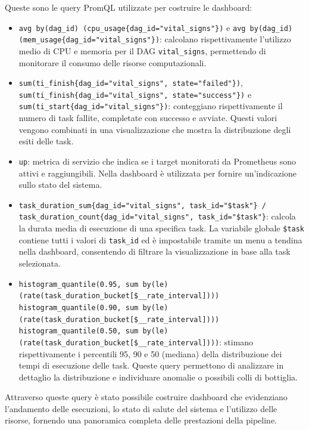 Queste sono le query PromQL utilizzate per costruire le dashboard:

\begin{itemize}
    \item \texttt{avg by(dag\_id) (cpu\_usage\{dag\_id="vital\_signs"\})} e \texttt{avg by(dag\_id) (mem\_usage\{dag\_id="vital\_signs"\})}: calcolano rispettivamente l’utilizzo medio di CPU e memoria per il DAG \texttt{vital\_signs}, permettendo di monitorare il consumo delle risorse computazionali.
    
    \item \texttt{sum(ti\_finish\{dag\_id="vital\_signs", state="failed"\})}, \texttt{sum(ti\_finish\{dag\_id="vital\_signs", state="success"\})} e \texttt{sum(ti\_start\{dag\_id="vital\_signs"\})}: conteggiano rispettivamente il numero di task fallite, completate con successo e avviate. Questi valori vengono combinati in una visualizzazione che mostra la distribuzione degli esiti delle task.
    
    \item \texttt{up}: metrica di servizio che indica se i target monitorati da Prometheus sono attivi e raggiungibili. Nella dashboard è utilizzata per fornire un’indicazione sullo stato del sistema.
    
    \item \texttt{task\_duration\_sum\{dag\_id="vital\_signs", task\_id="\$task"\} / task\_duration\_count\{dag\_id="vital\_signs", task\_id="\$task"\}}: calcola la durata media di esecuzione di una specifica task. La variabile globale \texttt{\$task} contiene tutti i valori di \texttt{task\_id} ed è impostabile tramite un menu a tendina nella dashboard, consentendo di filtrare la visualizzazione in base alla task selezionata.
    
    \item \texttt{histogram\_quantile(0.95, sum by(le)(rate(task\_duration\_bucket[\$\_\_rate\_interval])))}  
    \texttt{histogram\_quantile(0.90, sum by(le)(rate(task\_duration\_bucket[\$\_\_rate\_interval])))}  
    \texttt{histogram\_quantile(0.50, sum by(le)(rate(task\_duration\_bucket[\$\_\_rate\_interval])))}: stimano rispettivamente i percentili 95, 90 e 50 (mediana) della distribuzione dei tempi di esecuzione delle task. Queste query permettono di analizzare in dettaglio la distribuzione e individuare anomalie o possibili colli di bottiglia.
\end{itemize}

Attraverso queste query è stato possibile costruire dashboard che evidenziano l’andamento delle esecuzioni, lo stato di salute del sistema e l’utilizzo delle risorse, fornendo una panoramica completa delle prestazioni della pipeline.



